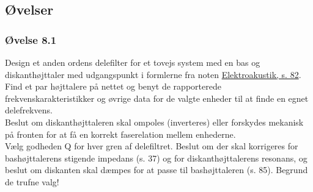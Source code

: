 \subsection{Øvelser}
\subsubsection{Øvelse 8.1}
Design et anden ordens delefilter for et tovejs system med en bas og diskanthøjttaler med udgangspunkt i formlerne fra noten \href{http://www.torean.dk/artikel/Elektroakustik.pdf}{Elektroakustik, s. 82}. Find et par højttalere på nettet og benyt de rapporterede frekvenskarakteristikker og øvrige data for de valgte enheder til at finde en egnet delefrekvens. \\

\noindent Beslut om diskanthøjttaleren skal ompoles (inverteres) eller forskydes mekanisk på fronten for at få en korrekt faserelation mellem enhederne. \\

\noindent Vælg godheden Q for hver gren af delefiltret. Beslut om der skal korrigeres for bashøjttalerens stigende impedans (s. 37) og for diskanthøjttalerens resonans, og beslut om diskanten skal dæmpes for at passe til bashøjttaleren (s. 85). Begrund de trufne valg!

